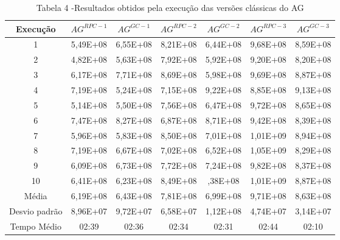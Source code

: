 \begin{table}[H]
\centering
\caption{Tabela 4 -Resultados obtidos pela execução das versões clássicas do AG}

\begin{tabular}{|c|c|c|c|c|c|c|}
\hline
Execução & $AG^{RPC-1}$ & $AG^{GC-1}$ & $AG^{RPC-2}$ & $AG^{GC-2}$ & $AG^{RPC-3}$ & $AG^{GC-3}$ \\ \hline
1 & 5,49E+08 & 6,55E+08 & 8,21E+08 & 6,44E+08 & 9,68E+08 & 8,59E+08 \\ \hline
2 & 4,82E+08 & 5,63E+08 & 7,92E+08 & 5,92E+08 & 9,20E+08 & 8,20E+08 \\ \hline
3 & 6,17E+08 & 7,71E+08 & 8,69E+08 & 5,98E+08 & 9,69E+08 & 8,87E+08 \\ \hline
4 & 7,19E+08 & 5,24E+08	& 7,15E+08 & 9,22E+08 & 8,85E+08 & 9,13E+08 \\ \hline
5 & 5,14E+08 & 5,50E+08 & 7,56E+08 & 6,47E+08 & 9,72E+08 & 8,65E+08 \\ \hline
6 & 7,47E+08 & 8,27E+08 & 6,87E+08 & 8,71E+08 & 9,42E+08 & 8,39E+08 \\ \hline
7 & 5,96E+08 & 5,83E+08 & 8,50E+08 & 7,01E+08 & 1,01E+09 & 8,94E+08 \\ \hline
8 & 7,19E+08 & 6,67E+08 & 7,02E+08 & 6,52E+08 & 1,05E+09 & 8,29E+08 \\ \hline
9 & 6,09E+08 & 6,73E+08 & 7,72E+08 & 7,24E+08 & 9,82E+08 & 8,37E+08 \\ \hline
10 & 6,41E+08 & 6,23E+08 & 8,49E+08 & ,38E+08 & 1,01E+09 & 8,87E+08 \\ \hline

Média & 6,19E+08 & 6,43E+08 & 7,81E+08 & 6,99E+08 & 9,71E+08 & 8,63E+08 \\ \hline
Desvio padrão & 8,96E+07 & 9,72E+07 & 6,58E+07 & 1,12E+08 & 4,74E+07 & 3,14E+07 \\ \hline
Tempo Médio & 02:39 & 02:36 & 02:34 & 02:31 & 02:44 & 02:10 \\ \hline
\end{tabular}
\end{table}

